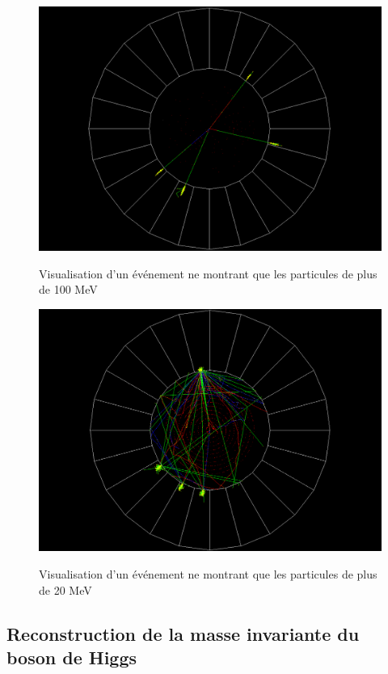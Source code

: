 \documentclass[11pt]{article}
\begin{document}
\begin{figure}
\caption{Visualisation d'un événement ne montrant que les particules de plus
de 100 MeV}
\includegraphics[scale=0.40]{images/evenPlus100MeV.png}
\label{viz1}
\end{figure}

\begin{figure}
\caption{Visualisation d'un événement ne montrant que les particules de plus
de 20 MeV}
\includegraphics[scale=0.40]{images/evenPlus20MeV3.png}
\label{viz2}
\end{figure}

\newpage
\subsection{Reconstruction de la masse invariante du boson de Higgs}
\end{document}
